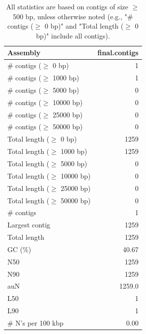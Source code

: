 \documentclass[12pt,a4paper]{article}
\begin{document}
\begin{table}[ht]
\begin{center}
\caption{All statistics are based on contigs of size $\geq$ 500 bp, unless otherwise noted (e.g., "\# contigs ($\geq$ 0 bp)" and "Total length ($\geq$ 0 bp)" include all contigs).}
\begin{tabular}{|l*{1}{|r}|}
\hline
Assembly & final.contigs \\ \hline
\# contigs ($\geq$ 0 bp) & 1 \\ \hline
\# contigs ($\geq$ 1000 bp) & 1 \\ \hline
\# contigs ($\geq$ 5000 bp) & 0 \\ \hline
\# contigs ($\geq$ 10000 bp) & 0 \\ \hline
\# contigs ($\geq$ 25000 bp) & 0 \\ \hline
\# contigs ($\geq$ 50000 bp) & 0 \\ \hline
Total length ($\geq$ 0 bp) & 1259 \\ \hline
Total length ($\geq$ 1000 bp) & 1259 \\ \hline
Total length ($\geq$ 5000 bp) & 0 \\ \hline
Total length ($\geq$ 10000 bp) & 0 \\ \hline
Total length ($\geq$ 25000 bp) & 0 \\ \hline
Total length ($\geq$ 50000 bp) & 0 \\ \hline
\# contigs & 1 \\ \hline
Largest contig & 1259 \\ \hline
Total length & 1259 \\ \hline
GC (\%) & 40.67 \\ \hline
N50 & 1259 \\ \hline
N90 & 1259 \\ \hline
auN & 1259.0 \\ \hline
L50 & 1 \\ \hline
L90 & 1 \\ \hline
\# N's per 100 kbp & 0.00 \\ \hline
\end{tabular}
\end{center}
\end{table}
\end{document}
